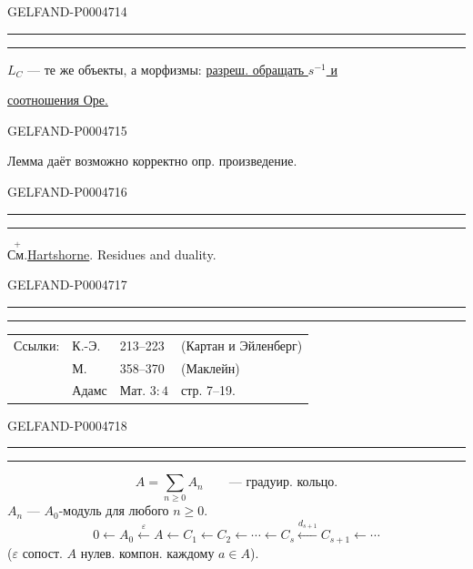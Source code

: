 \begin{GelfandAdjacentEvidence}{GELFAND-P000471}{4}


{\centering\rule{3em}{.4pt}\quad\textperiodcentered\quad\rule{3.4em}{.4pt}\par}
$L_C$ — те же объекты, а морфизмы: \uline{разреш. обращать \mbox{$s^{-1}$} и}
\par\hspace*{3em}\uline{соотношения Оре.}
\end{GelfandAdjacentEvidence}
\begin{GelfandAdjacentEvidence}{GELFAND-P000471}{5}

Лемма даёт возможно корректно опр. произведение.
\end{GelfandAdjacentEvidence}
\begin{GelfandAdjacentEvidence}{GELFAND-P000471}{6}


{\centering\rule{3em}{.4pt}\quad\textperiodcentered\quad\rule{3.5em}{.4pt}\par}
\(\overset{\scriptstyle +}{\text{См.}}\)\quad\uline{Hartshorne}. Residues and duality.
\end{GelfandAdjacentEvidence}
\begin{GelfandAdjacentEvidence}{GELFAND-P000471}{7}


{\centering\rule{3.9em}{.4pt}\quad\textperiodcentered\quad\rule{3.4em}{.4pt}\par}

\begin{tabular}{@{}llll@{}}
Ссылки: & К.-Э. & 213--223 & (Картан и Эйленберг)\\
 & М. & 358--370 & (Маклейн)\\
 & Адамс & Мат. $3\colon4$ & стр. 7--19.
\end{tabular}
\end{GelfandAdjacentEvidence}
\begin{GelfandAdjacentEvidence}{GELFAND-P000471}{8}


{\centering\rule{2.8em}{.4pt}\quad\textperiodcentered\quad\rule{3em}{.4pt}\par}
\[
A=\sum_{n\geqslant0}A_n\qquad\text{— градуир. кольцо.}
\]
$A_n$ — $A_0$-модуль для любого $n\geqslant0$.
\[
0\longleftarrow A_0\xleftarrow{\varepsilon}A
\longleftarrow C_1\longleftarrow C_2\longleftarrow\cdots
\longleftarrow C_s\xleftarrow{d_{s+1}}C_{s+1}\longleftarrow\cdots
\]
($\varepsilon$ сопост. $A$ нулев. компон. каждому $a\in A$).
\end{GelfandAdjacentEvidence}
